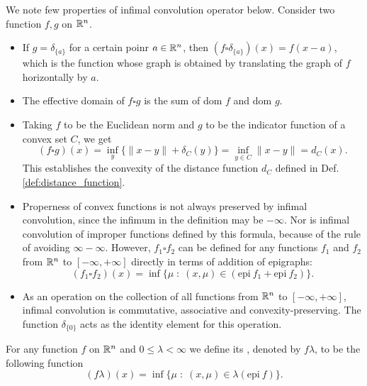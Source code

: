\documentclass[11pt,a4paper]{article}
\begin{document}
\begin{remark}
    We note few properties of infimal convolution operator below. Consider two function $f,g$ on $\mathbb{R}^n$.
    \begin{itemize}
        \item If $g = \delta_{\{a\}}$ for a certain poinr $a\in \mathbb{R}^n$, then $(f\square \delta_{\{a\}})(x) = f(x-a)$, which is the function whose graph is obtained by translating the graph of $f$ horizontally by $a$.
        \item The effective domain of $f\square g$ is the sum of dom $f$ and dom $g$.
        \item Taking $f$ to be the Euclidean norm and $g$ to be the indicator function of a convex set $C$, we get
        \begin{equation*}
            (f\square g)(x) = \inf_y \{\|x-y\|+\delta_C(y)\} = \inf_{y\in C} \|x-y\| = d_C(x).
        \end{equation*}
        This establishes the convexity of the distance function $d_C$ defined in Def. \ref{def:distance_function}.
        \item Properness of convex functions is not always preserved by infimal convolution, since the infimum in the definition may be $-\infty$. Nor is infimal convolution of improper functions defined by this formula, because of the rule of avoiding $\infty-\infty$. However, $f_1\square f_2$ can be defined for any functions $f_1$ and $f_2$ from $\mathbb{R}^n$ to $[-\infty,+\infty]$ directly in terms of addition of epigraphs:
        \begin{equation*}
            (f_1\square f_2)(x) = \inf\{\mu\;:\; (x,\mu)\in (\text{epi}\ f_1+\text{epi}\ f_2)\}.
        \end{equation*}
        \item As an operation on the collection of all functions from $\mathbb{R}^n$ to $[-\infty,+\infty]$, infimal convolution is commutative, associative and convexity-preserving. The function $\delta_{\{0\}}$ acts as the identity element for this operation. 
    \end{itemize}
\end{remark}

\begin{definition}
    For any function $f$ on $\mathbb{R}^n$ and $0\le\lambda<\infty$ we define its , denoted by $f\lambda$, to be the following function
    \begin{equation*}
        (f\lambda)(x) = \inf\{\mu\;:\;(x,\mu)\in \lambda (\text{epi}\ f)\}.
    \end{equation*}
\end{definition}
\end{document}
